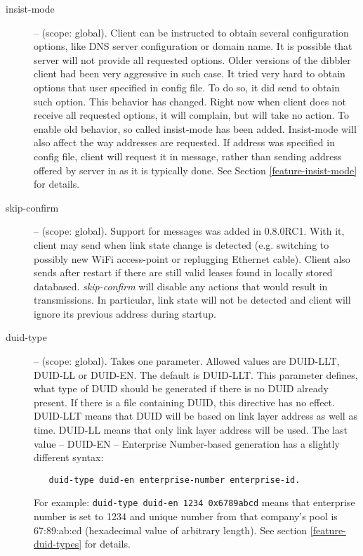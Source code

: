 \begin{description}
 \item[insist-mode] -- (scope: global). Client can be instructed to
   obtain several configuration options, like DNS server configuration
   or domain name. It is possible that server will not provide all
   requested options. Older versions of the dibbler client had been
   very aggressive in such case. It tried very hard to obtain options
   that user specified in config file. To do so, it did
   send  to obtain such option. This behavior has
   changed. Right now when client does not receive all requested
   options, it will complain, but will take no action. To enable old
   behavior, so called insist-mode has been added. Insist-mode will
   also affect the way addresses are requested. If address was
   specified in config file, client will request it in 
   message, rather than sending address offered by server
   in  as it is typically done. See
   Section \ref{feature-insist-mode} for details.

 \item[skip-confirm] -- (scope: global). Support for  messages
   was added in 0.8.0RC1. With it, client may send  when link
   state change is detected (e.g. switching to possibly new WiFi
   access-point or replugging Ethernet cable). Client also sends
    after restart if there are still valid leases found
   in locally stored databased. \emph{skip-confirm} will disable any
   actions that would result in  transmissions. In
   particular, link state will not be detected and client will ignore
   its previous address during startup.




 \item[duid-type] -- (scope: global). Takes one parameter. Allowed
   values are DUID-LLT, DUID-LL or DUID-EN. The default is DUID-LLT.
   This parameter defines, what type of DUID should be generated if
   there is no DUID already present. If there is a file containing
   DUID, this directive has no effect. DUID-LLT means that DUID will
   be based on link layer address as well as time. DUID-LL means that
   only link layer address will be used. The last value -- DUID-EN --
   Enterprise Number-based generation has a slightly different syntax:
 \begin{lstlisting}
   duid-type duid-en enterprise-number enterprise-id.
\end{lstlisting}
   For example: \verb+duid-type duid-en 1234 0x6789abcd+ means that
   enterprise number is set to 1234 and unique number from that
   company's pool is 67:89:ab:cd (hexadecimal value of arbitrary
   length). See section \ref{feature-duid-types} for details.


\end{description}
